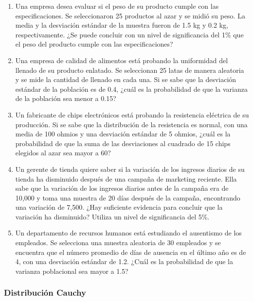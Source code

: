 \begin{Ejer}
\begin{enumerate}
    \item Una empresa desea evaluar si el peso de su producto cumple con las especificaciones. Se seleccionaron 25 productos al azar y se midió su peso. La media y la desviación estándar de la muestra fueron de 1.5 kg y 0.2 kg, respectivamente. ¿Se puede concluir con un nivel de significancia del 1\% que el peso del producto cumple con las especificaciones?

    \item Una empresa de calidad de alimentos está probando la uniformidad del llenado de su producto enlatado. Se seleccionan 25 latas de manera aleatoria y se mide la cantidad de llenado en cada una. Si se sabe que la desviación estándar de la población es de 0.4, ¿cuál es la probabilidad de que la varianza de la población sea menor a 0.15?

    \item Un fabricante de chips electrónicos está probando la resistencia eléctrica de su producción. Si se sabe que la distribución de la resistencia es normal, con una media de 100 ohmios y una desviación estándar de 5 ohmios, ¿cuál es la probabilidad de que la suma de las desviaciones al cuadrado de 15 chips elegidos al azar sea mayor a 60?

    \item Un gerente de tienda quiere saber si la variación de los ingresos diarios de su tienda ha disminuido después de una campaña de marketing reciente. Ella sabe que la variación de los ingresos diarios antes de la campaña era de 10{,}000 y toma una muestra de 20 días después de la campaña, encontrando una variación de 7{,}500. ¿Hay suficiente evidencia para concluir que la variación ha disminuido? Utiliza un nivel de significancia del 5\%.

    \item Un departamento de recursos humanos está estudiando el ausentismo de los empleados. Se selecciona una muestra aleatoria de 30 empleados y se encuentra que el número promedio de días de ausencia en el último año es de 4, con una desviación estándar de 1.2. ¿Cuál es la probabilidad de que la varianza poblacional sea mayor a 1.5?

\end{enumerate}

\end{Ejer}


\subsubsection{Distribución Cauchy}


